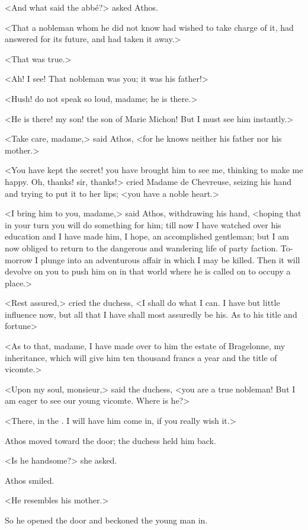 <And what said the abbé?> asked Athos.

<That a nobleman whom he did not know had wished to take charge of it, had answered for its future, and had taken it away.>

<That was true.>

<Ah! I see! That nobleman was you; it was his father!>

<Hush! do not speak so loud, madame; he is there.>

<He is there! my son! the son of Marie Michon! But I must see him instantly.>

<Take care, madame,> said Athos, <for he knows neither his father nor his mother.>

<You have kept the secret! you have brought him to see me, thinking to make me happy. Oh, thanks! sir, thanks!> cried Madame de Chevreuse, seizing his hand and trying to put it to her lips; <you have a noble heart.>

<I bring him to you, madame,> said Athos, withdrawing his hand, <hoping that in your turn you will do something for him; till now I have watched over his education and I have made him, I hope, an accomplished gentleman; but I am now obliged to return to the dangerous and wandering life of party faction. To-morrow I plunge into an adventurous affair in which I may be killed. Then it will devolve on you to push him on in that world where he is called on to occupy a place.>

<Rest assured,> cried the duchess, <I shall do what I can. I have but little influence now, but all that I have shall most assuredly be his. As to his title and fortune\longdash>

<As to that, madame, I have made over to him the estate of Bragelonne, my inheritance, which will give him ten thousand francs a year and the title of vicomte.>

<Upon my soul, monsieur,> said the duchess, <you are a true nobleman! But I am eager to see our young vicomte. Where is he?>

<There, in the . I will have him come in, if you really wish it.>

Athos moved toward the door; the duchess held him back.

<Is he handsome?> she asked.

Athos smiled.

<He resembles his mother.>

So he opened the door and beckoned the young man in.

